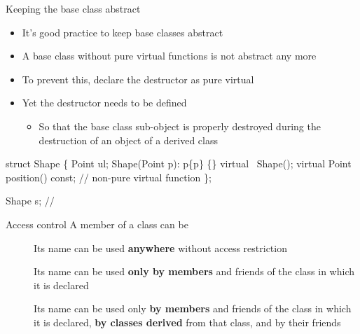 \begin{frame}[fragile]{Keeping the base class abstract}

  \begin{itemize}
  \item It's good practice to keep base classes abstract
  \item A base class without pure virtual functions is not abstract any more
  \item<2-> To prevent this, declare the destructor as pure virtual
  \item<3-> Yet the destructor needs to be defined
    \begin{itemize}
    \item So that the base class sub-object is properly destroyed during the
      destruction of an object of a derived class
    \end{itemize}
  \end{itemize}

  \begin{codeblock}
struct Shape \{
  Point ul;
  Shape(Point p): p\{p\} \{\}
  virtual ~Shape();
  virtual Point position() const; // non-pure virtual function
\};

Shape s; // 
  \end{codeblock}
\end{frame}

\begin{frame}{Access control}
  A member of a class can be
  \begin{description}
  \item [] Its name can be used \textbf{anywhere} without access
    restriction
  \item [] Its name can be used \textbf{only by members} and friends of the
    class in which it is declared
  \item [] Its name can be used only \textbf{by members} and
    friends of the class in which it is declared, \textbf{by classes derived}
    from that class, and by their friends
  \end{description}
\end{frame}

